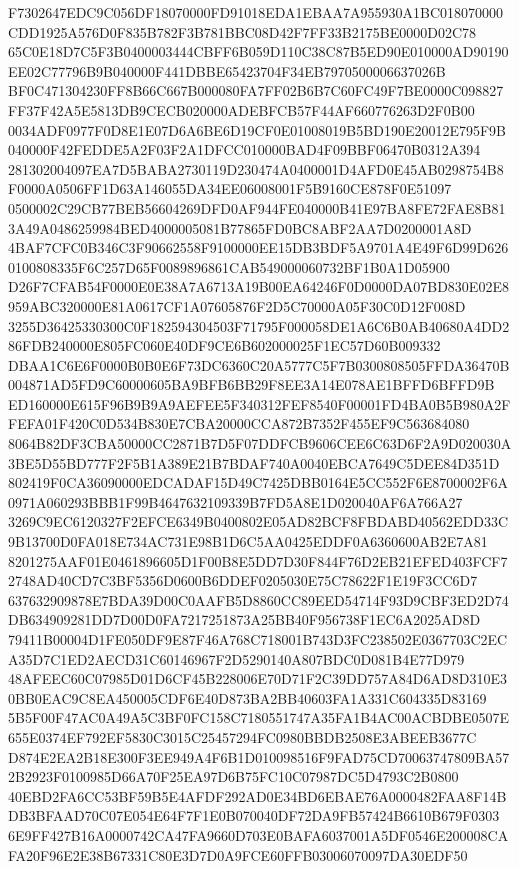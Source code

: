 \documentclass[UTF8,fontset=fandol,zihao=-4,a4paper]{ctexart}
\begin{document}
{{F7302647EDC9C056DF18070000FD91018EDA1EBAA7A955930A1BC018070000CDD1925A576D0F835B782F3B781BBC08D42F7FF33B2175BE0000D02C78
65C0E18D7C5F3B0400003444CBFF6B059D110C38C87B5ED90E010000AD90190EE02C77796B9B040000F441DBBE65423704F34EB7970500006637026B
BF0C471304230FF8B66C667B000080FA7FF02B6B7C60FC49F7BE0000C098827FF37F42A5E5813DB9CECB020000ADEBFCB57F44AF660776263D2F0B00
0034ADF0977F0D8E1E07D6A6BE6D19CF0E01008019B5BD190E20012E795F9B040000F42FEDDE5A2F03F2A1DFCC010000BAD4F09BBF06470B0312A394
281302004097EA7D5BABA2730119D230474A0400001D4AFD0E45AB0298754B8F0000A0506FF1D63A146055DA34EE06008001F5B9160CE878F0E51097
0500002C29CB77BEB56604269DFD0AF944FE040000B41E97BA8FE72FAE8B813A49A0486259984BED4000005081B77865FD0BC8ABF2AA7D0200001A8D
4BAF7CFC0B346C3F90662558F9100000EE15DB3BDF5A9701A4E49F6D99D6260100808335F6C257D65F0089896861CAB549000060732BF1B0A1D05900
D26F7CFAB54F0000E0E38A7A6713A19B00EA64246F0D0000DA07BD830E02E8959ABC320000E81A0617CF1A07605876F2D5C70000A05F30C0D12F008D
3255D36425330300C0F182594304503F71795F000058DE1A6C6B0AB40680A4DD286FDB240000E805FC060E40DF9CE6B602000025F1EC57D60B009332
DBAA1C6E6F0000B0B0E6F73DC6360C20A5777C5F7B0300808505FFDA36470B004871AD5FD9C60000605BA9BFB6BB29F8EE3A14E078AE1BFFD6BFFD9B
ED160000E615F96B9B9A9AEFEE5F340312FEF8540F00001FD4BA0B5B980A2FFEFA01F420C0D534B830E7CBA20000CCA872B7352F455EF9C563684080
8064B82DF3CBA50000CC2871B7D5F07DDFCB9606CEE6C63D6F2A9D020030A3BE5D55BD777F2F5B1A389E21B7BDAF740A0040EBCA7649C5DEE84D351D
802419F0CA36090000EDCADAF15D49C7425DBB0164E5CC552F6E8700002F6A0971A060293BBB1F99B4647632109339B7FD5A8E1D020040AF6A766A27
3269C9EC6120327F2EFCE6349B0400802E05AD82BCF8FBDABD40562EDD33C9B13700D0FA018E734AC731E98B1D6C5AA0425EDDF0A6360600AB2E7A81
8201275AAF01E0461896605D1F00B8E5DD7D30F844F76D2EB21EFED403FCF72748AD40CD7C3BF5356D0600B6DDEF0205030E75C78622F1E19F3CC6D7
637632909878E7BDA39D00C0AAFB5D8860CC89EED54714F93D9CBF3ED2D74DB634909281DD7D00D0FA7217251873A25BB40F956738F1EC6A2025AD8D
79411B00004D1FE050DF9E87F46A768C718001B743D3FC238502E0367703C2ECA35D7C1ED2AECD31C60146967F2D5290140A807BDC0D081B4E77D979
48AFEEC60C07985D01D6CF45B228006E70D71F2C39DD757A84D6AD8D310E30BB0EAC9C8EA450005CDF6E40D873BA2BB40603FA1A331C604335D83169
5B5F00F47AC0A49A5C3BF0FC158C7180551747A35FA1B4AC00ACBDBE0507E655E0374EF792EF5830C3015C25457294FC0980BBDB2508E3ABEEB3677C
D874E2EA2B18E300F3EE949A4F6B1D010098516F9FAD75CD70063747809BA572B2923F0100985D66A70F25EA97D6B75FC10C07987DC5D4793C2B0800
40EBD2FA6CC53BF59B5E4AFDF292AD0E34BD6EBAE76A0000482FAA8F14BDB3BFAAD70C07E054E64F7F1E0B070040DF72DA9FB57424B6610B679F0303
6E9FF427B16A0000742CA47FA9660D703E0BAFA6037001A5DF0546E200008CAFA20F96E2E38B67331C80E3D7D0A9FCE60FFB03006070097DA30EDF50
}}
\end{document}
